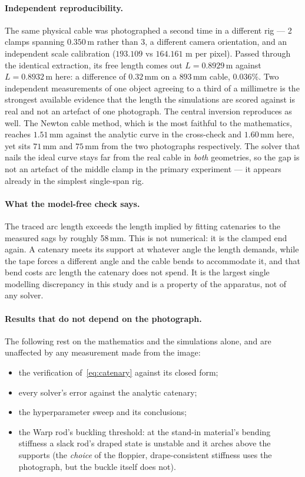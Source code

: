 \documentclass[11pt,a4paper]{article}
\begin{document}
\paragraph{Independent reproducibility.} The same physical cable was photographed a second time in a different rig --- 2 clamps spanning $0.350$\,m rather than 3, a different camera orientation, and an independent scale calibration ($193.109$ vs $164.161$ \textmu m per pixel). Passed through the identical extraction, its free length comes out $L = 0.8929$\,m against $L = 0.8932$\,m here: a difference of $0.32$\,mm on a $893$\,mm cable, $0.036\%$. Two independent measurements of one object agreeing to a third of a millimetre is the strongest available evidence that the length the simulations are scored against is real and not an artefact of one photograph. The central inversion reproduces as well. The Newton cable method, which is the most faithful to the mathematics, reaches $1.51$\,mm against the analytic curve in the cross-check and $1.60$\,mm here, yet sits $71$\,mm and $75$\,mm from the two photographs respectively. The solver that nails the ideal curve stays far from the real cable in \emph{both} geometries, so the gap is not an artefact of the middle clamp in the primary experiment --- it appears already in the simplest single-span rig.

\paragraph{What the model-free check says.} The traced arc length exceeds the
length implied by fitting catenaries to the measured sags by roughly 58\,mm.
This is not numerical: it is the clamped end again. A catenary meets its
support at whatever angle the length demands, while the tape forces a
different angle and the cable bends to accommodate it, and that bend costs arc
length the catenary does not spend. It is the largest single modelling
discrepancy in this study and is a property of the apparatus, not of any
solver.

\paragraph{Results that do not depend on the photograph.} The following rest
on the mathematics and the simulations alone, and are unaffected by any
measurement made from the image:
\begin{itemize}
  \item the verification of~\eqref{eq:catenary} against its closed form;
  \item every solver's error against the analytic catenary;
  \item the hyperparameter sweep and its conclusions;
  \item the Warp rod's buckling threshold: at the stand-in material's bending
        stiffness a slack rod's draped state is unstable and it arches above the
        supports (the \emph{choice} of the floppier, drape-consistent stiffness
        uses the photograph, but the buckle itself does not).
\end{itemize}
\end{document}
